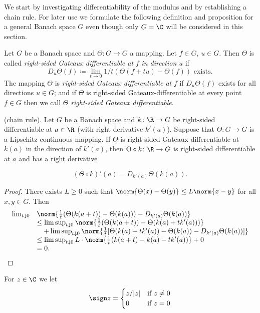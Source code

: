 We start by investigating differentiability of the modulus and by establishing a chain rule.
For later use we formulate the following definition and proposition for a general Banach space $G$ even though only $G = \C$ will be considered in this section.

\begin{definition}\label{def:b2-2.2}
Let $G$ be a Banach space and $\Theta \colon G \to G$ a mapping.
Let $f \in G$, $u \in G$.
Then $\Theta$ is called \emph{right-sided Gateaux differentiable at} $f$ \emph{in direction} $u$ if
\begin{equation}\label{eq:b2-2.3}
D_{u}\Theta(f) \coloneqq \lim_{t \to 0} 1/t(\Theta(f+tu) - \Theta(f)) \text{ exists.}
\end{equation}
The mapping $\Theta$ is \emph{right-sided Gateaux differentiable at} $f$ if\/ $D_{u}\Theta(f)$ exists for all directions $u \in G$; and if\/ $\Theta$ is right-sided Gateaux-differentiable at every point $f \in G$ then we call $\Theta$ \emph{right-sided Gateaux differentiable}.
\end{definition}

\begin{proposition} \label{prop:b2-2.3}
(chain rule). Let $G$ be a Banach space and $k \colon \R \to G$ be right-sided differentiable at $a \in \R$ (with right derivative $k'(a)$).
Suppose that $\Theta \colon G \to G$ is a Lipschitz continuous mapping.
If\/ $\Theta$ is right-sided Gateaux-differentiable at $k(a)$ in the direction of\/ $k'(a)$, then $\Theta \circ k \colon \R \to G$ is right-sided differentiable at $a$ and has a right derivative

\begin{equation}\label{eq:b2-2.4}
(\Theta \circ k)'(a) = D_{k'(a)}\Theta(k(a)).
\end{equation}
\end{proposition}
\begin{proof}
There exists $L \geq 0$ such that $\norm{\Theta(x) - \Theta(y)} \leq L\norm{x - y}$ for all $x,y \in G$.
Then
\[
\begin{array}{lll}
\lim_{t \downarrow 0} &\norm{\frac{1}{t} (\Theta(k(a+t)) - \Theta(k(a))) - D_{k'(a)}\Theta(k(a))} \\
&\leq \limsup_{t \downarrow 0} \norm{\frac{1}{t} (\Theta(k(a+t)) - \Theta(k(a)+tk'(a)))} \\
&\quad + \limsup_{t \downarrow 0} \norm{\frac{1}{t} [\Theta(k(a)+tk'(a)) - \Theta(k(a)) - D_{k'(a)}\Theta(k(a))]} \\
&\leq \limsup_{t \downarrow 0} L \cdot \norm{\frac{1}{t} (k(a+t) - k(a)-tk'(a))} + 0 \\
&= 0.
\end{array}
\]
\phantom{x}
\end{proof}
For $z \in \C$ we let
\begin{equation}\label{eq:b2-2.5}
\sign z = \begin{cases}
    z/|z| & \text{if } z \neq 0 \\
    0 & \text{if } z = 0
\end{cases}
\end{equation}


